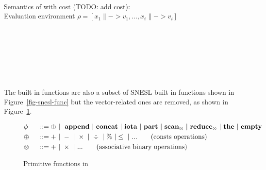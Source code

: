 
\\[3ex]



Semantics of \mysnesl with cost (TODO: add cost): \\
Evaluation environment $ \rho = [x_1 \|-> v_1,...,x_i \|-> v_i]$ \\

	\\[3ex]
	\PT{
		\Axiom{\Eval{\rho}{\{\}\tau}{\{\}}}
	}\\[3ex]

	\\[3ex]
	
	\\[3ex]
	
	\\[3ex]
	\\[3ex]
	\\[3ex]


The built-in functions are also a subset of SNESL built-in functions shown in Figure~\ref{fig-snesl-func} but  the vector-related ones are removed, as shown in Figure~\ref{fig-mysnesl-func}. 

\begin{figure}[h]
	\begin{alignat*}{2} 
	&\phi && ::= \oplus \ | \  \ \mathbf{append} \ | \ \mathbf{concat}  \ | \ \mathbf{iota}  \ | \ \mathbf{part}  \ | \ \mathbf{scan}_\otimes \ | \ \mathbf{reduce}_{\otimes} \ | \ \mathbf{the}  \ | \ \mathbf{empty} \\
	& \oplus  \ && :: = + \ | \ - \ | \ \times \ |  \  \div \ | \ \% \ | \le \ | \ ... \tag{consts operations} \\
	& \otimes \ && :: = + \ | \ \times  \ | \ ...  \tag{associative binary operations}
	\end{alignat*}
	\caption{Primitive functions in \mysnesl \label{fig-mysnesl-func}}
\end{figure}

